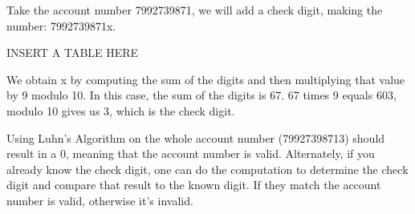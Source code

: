 \documentclass{article}
\begin{document}
Take the account number 7992739871, we will add a check digit, making the
number: 7992739871x.

INSERT A TABLE HERE

We obtain x by computing the sum of the digits and then multiplying that value
by 9 modulo 10. In this case, the sum of the digits is 67. 67 times 9 equals
603, modulo 10 gives us 3, which is the check digit.

Using Luhn's Algorithm on the whole account number (79927398713) should result
in a 0, meaning that the account number is valid. Alternately,
if you already know the check digit, one can do the computation to determine
the check digit and compare that result to the known digit. If they match the
account number is valid, otherwise it's invalid.
\end{document}
